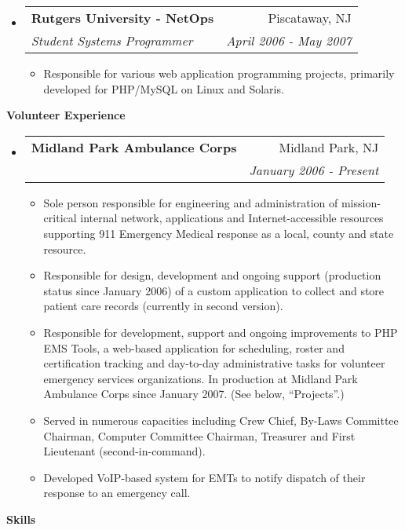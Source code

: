\documentclass[letterpaper,11pt]{article}
\makeatletter
\newcommand{\resitem}[1]{\item #1 \vspace{-2pt}}
\newcommand{\resheading}[1]{{\large \colorbox{mygrey}{\begin{minipage}{\textwidth}{\textbf{#1 \vphantom{p\^{E}}}}\end{minipage}}}}
\newcommand{\ressubheading}[4]{
\begin{tabular*}{7.0in}{l@{\extracolsep{\fill}}r}
		\textbf{#1} & #2 \\
		\textit{#3} & \textit{#4} \\
\end{tabular*}\vspace{-6pt}}
\makeatother
\begin{document}
\begin{itemize}
\item
	\ressubheading{Rutgers University - NetOps}{Piscataway, NJ}{Student Systems Programmer}{April 2006 - May 2007}
	\begin{itemize}
		\resitem{Responsible for various web application programming projects, primarily developed for
                  PHP/MySQL on Linux and Solaris.}
	\end{itemize}

\end{itemize}

\resheading{Volunteer Experience}
\begin{itemize}
\item
        \ressubheading{Midland Park Ambulance Corps}{Midland Park, NJ}{}{January 2006 - Present}
        \begin{itemize}
                \resitem{Sole person responsible for engineering and administration of
                  mission-critical internal network, applications and
                  Internet-accessible resources supporting 911 Emergency
                  Medical response as a local, county and state resource.}
                \resitem{Responsible for design, development and ongoing support (production
                  status since January 2006) of a custom application to
                  collect and store patient care records (currently in second version).}
                \resitem{Responsible for development, support and ongoing
                  improvements to PHP EMS Tools, a web-based application for
                  scheduling, roster and certification tracking and day-to-day
                administrative tasks for volunteer emergency services
                organizations. In production at Midland Park Ambulance Corps
                since January 2007. (See below, ``Projects''.)}
                \resitem{Served in numerous capacities including Crew Chief,
                  By-Laws Committee Chairman, Computer Committee Chairman,
                  Treasurer and First Lieutenant (second-in-command).}
                \resitem{Developed VoIP-based system for EMTs to notify
                  dispatch of their response to an emergency call.}
        \end{itemize}
\end{itemize}

\resheading{Skills}
\end{document}
